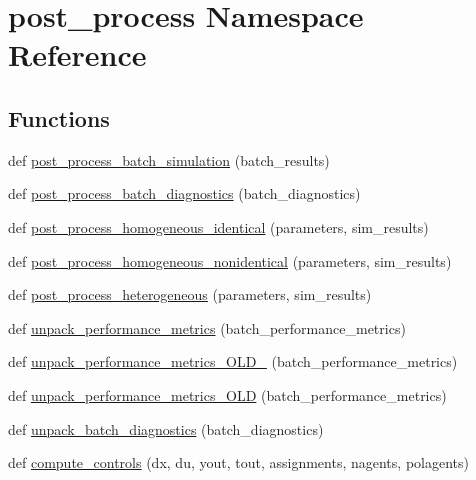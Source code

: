 \hypertarget{namespacepost__process}{}\section{post\+\_\+process Namespace Reference}
\label{namespacepost__process}
\subsection*{Functions}
\begin{DoxyCompactItemize}
\item 
def \mbox{\hyperlink{namespacepost__process_a2009d5938a8919bd33d7d274148e5263}{post\+\_\+process\+\_\+batch\+\_\+simulation}} (batch\+\_\+results)
\item 
def \mbox{\hyperlink{namespacepost__process_a5b319220652a268ee1dcbb710f38b420}{post\+\_\+process\+\_\+batch\+\_\+diagnostics}} (batch\+\_\+diagnostics)
\item 
def \mbox{\hyperlink{namespacepost__process_aed2ed4226d6805a549be6b3e9c9ec72d}{post\+\_\+process\+\_\+homogeneous\+\_\+identical}} (parameters, sim\+\_\+results)
\item 
def \mbox{\hyperlink{namespacepost__process_a11b9639a84b126d743bb26abe37ad8bc}{post\+\_\+process\+\_\+homogeneous\+\_\+nonidentical}} (parameters, sim\+\_\+results)
\item 
def \mbox{\hyperlink{namespacepost__process_a03fb7a7f49933480f1162e53995ca131}{post\+\_\+process\+\_\+heterogeneous}} (parameters, sim\+\_\+results)
\item 
def \mbox{\hyperlink{namespacepost__process_ac12d2839c57449ae1f8c071818ed5755}{unpack\+\_\+performance\+\_\+metrics}} (batch\+\_\+performance\+\_\+metrics)
\item 
def \mbox{\hyperlink{namespacepost__process_a5b5b5271b7f2487e85d72afcc40903e7}{unpack\+\_\+performance\+\_\+metrics\+\_\+\+O\+L\+D\+\_}} (batch\+\_\+performance\+\_\+metrics)
\item 
def \mbox{\hyperlink{namespacepost__process_ab8236930ba1c5b6ecb3de8daacd16a8c}{unpack\+\_\+performance\+\_\+metrics\+\_\+\+O\+LD}} (batch\+\_\+performance\+\_\+metrics)
\item 
def \mbox{\hyperlink{namespacepost__process_ac0513ae17e16904513842075429d02f1}{unpack\+\_\+batch\+\_\+diagnostics}} (batch\+\_\+diagnostics)
\item 
def \mbox{\hyperlink{namespacepost__process_aa423e7971223069614adb1e47750a411}{compute\+\_\+controls}} (dx, du, yout, tout, assignments, nagents, polagents)

\end{DoxyCompactItemize}
